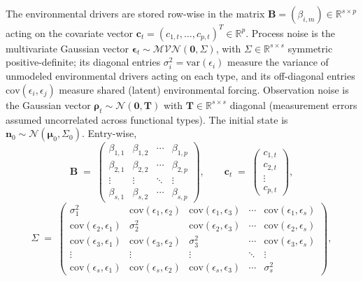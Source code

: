 \documentclass[12pt]{article}
\begin{document}
The environmental drivers are stored row-wise in the matrix $\mathbf{B}=(\beta_{i,m})\in\mathbb{R}^{s\times p}$ acting on the covariate vector $\mathbf{c}_{t}=(c_{1,t},\ldots,c_{p,t})^{T}\in\mathbb{R}^{p}$. Process noise is the multivariate Gaussian vector $\boldsymbol{\epsilon}_{t}\sim\mathcal{MVN}(\mathbf{0},\Sigma)$, with $\Sigma\in\mathbb{R}^{s\times s}$ symmetric positive-definite; its diagonal entries $\sigma_{i}^{2}=\mathrm{var}(\epsilon_{i})$ measure the variance of unmodeled environmental drivers acting on each type, and its off-diagonal entries $\mathrm{cov}(\epsilon_{i},\epsilon_{j})$ measure shared (latent) environmental forcing. Observation noise is the Gaussian vector $\boldsymbol{\rho}_{t}\sim\mathcal{N}(\mathbf{0},\mathbf{T})$ with $\mathbf{T}\in\mathbb{R}^{s\times s}$ diagonal (measurement errors assumed uncorrelated across functional types). The initial state is $\mathbf{n}_{0}\sim\mathcal{N}(\boldsymbol{\mu}_{0},\Sigma_{0})$. Entry-wise,
\begin{equation*}
	\mathbf{B} \;=\; \begin{pmatrix}
		\beta_{1,1} & \beta_{1,2} & \cdots & \beta_{1,p} \\
		\beta_{2,1} & \beta_{2,2} & \cdots & \beta_{2,p} \\
		\vdots & \vdots & \ddots & \vdots \\
		\beta_{s,1} & \beta_{s,2} & \cdots & \beta_{s,p}
	\end{pmatrix},\qquad
	\mathbf{c}_{t} \;=\; \begin{pmatrix} c_{1,t} \\ c_{2,t} \\ \vdots \\ c_{p,t} \end{pmatrix},
\end{equation*}
\begin{equation*}
	\Sigma \;=\; \begin{pmatrix}
		\sigma_{1}^{2} & \mathrm{cov}(\epsilon_{1},\epsilon_{2}) & \mathrm{cov}(\epsilon_{1},\epsilon_{3}) & \cdots & \mathrm{cov}(\epsilon_{1},\epsilon_{s}) \\
		\mathrm{cov}(\epsilon_{2},\epsilon_{1}) & \sigma_{2}^{2} & \mathrm{cov}(\epsilon_{2},\epsilon_{3}) & \cdots & \mathrm{cov}(\epsilon_{2},\epsilon_{s}) \\
		\mathrm{cov}(\epsilon_{3},\epsilon_{1}) & \mathrm{cov}(\epsilon_{3},\epsilon_{2}) & \sigma_{3}^{2} & \cdots & \mathrm{cov}(\epsilon_{3},\epsilon_{s}) \\
		\vdots & \vdots & \vdots & \ddots & \vdots \\
		\mathrm{cov}(\epsilon_{s},\epsilon_{1}) & \mathrm{cov}(\epsilon_{s},\epsilon_{2}) & \mathrm{cov}(\epsilon_{s},\epsilon_{3}) & \cdots & \sigma_{s}^{2}
	\end{pmatrix},
\end{equation*}
\end{document}
